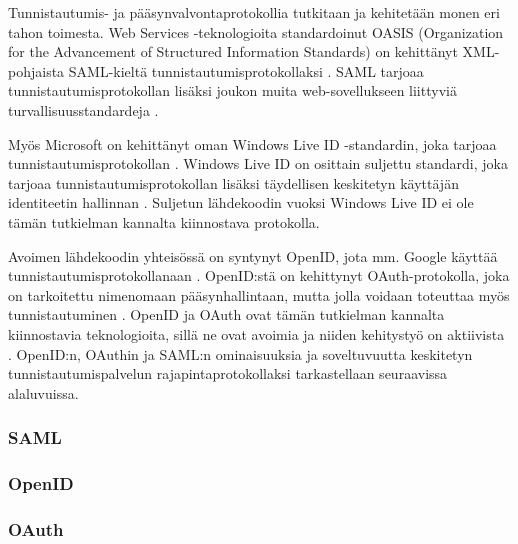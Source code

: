 Tunnistautumis- ja pääsynvalvontaprotokollia tutkitaan ja kehitetään monen eri tahon toimesta. Web Services -teknologioita standardoinut OASIS (Organization for the Advancement of Structured Information Standards) on kehittänyt XML-pohjaista SAML-kieltä tunnistautumisprotokollaksi \cite{saml_spec}. SAML tarjoaa tunnistautumisprotokollan lisäksi joukon muita web-sovellukseen liittyviä tur\-val\-li\-suus\-stan\-dar\-de\-ja \cite{next_saml}.

Myös Microsoft on kehittänyt oman Windows Live ID -standardin, joka tarjoaa tunnistautumisprotokollan \cite{open_identity}. Windows Live ID on osittain suljettu standardi, joka tarjoaa tunnistautumisprotokollan lisäksi täydellisen keskitetyn käyttäjän identiteetin hallinnan \cite{open_identity}. Suljetun lähdekoodin vuoksi Windows Live ID ei ole tämän tutkielman kannalta kiinnostava protokolla.

Avoimen lähdekoodin yhteisössä on syntynyt OpenID, jota mm. Google käyttää tunnistautumisprotokollanaan \cite{open_identity}. OpenID:stä on kehittynyt OAuth-pro\-to\-kol\-la, joka on tarkoitettu nimenomaan pääsynhallintaan, mutta jolla voidaan toteuttaa myös tunnistautuminen \cite{formal_oauth}. OpenID ja OAuth ovat tämän tutkielman kannalta kiinnostavia teknologioita, sillä ne ovat avoimia ja niiden kehitystyö on aktiivista \cite{facebook}. OpenID:n, OAuthin ja SAML:n ominaisuuksia ja soveltuvuutta keskitetyn tunnistautumispalvelun rajapintaprotokollaksi tarkastellaan seuraavissa alaluvuissa.

\subsubsection{SAML}

\subsubsection{OpenID}

\subsubsection{OAuth}
